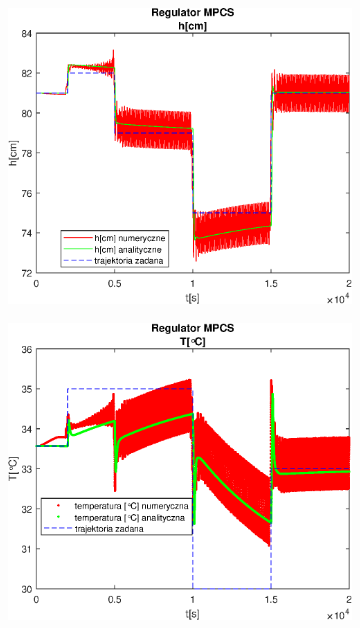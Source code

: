 \begin{figure}[h!]
   \centering
   \begin{subfigure}[b]{0.4\textwidth}
      \includegraphics[width=1\linewidth]{img/MPCSnumRK/MPCSRKHN150Nu25l60.eps}
      \caption{}
      \label{fig:fig:MPCSRKN150Nu25l601}
   \end{subfigure}
       
   \begin{subfigure}[b]{0.4\textwidth}
      \includegraphics[width=1\linewidth]{img/MPCSnumRK/MPCSRKTN150Nu25l60.eps}
      \caption{}
      \label{fig:fig:MPCSRKN150Nu25l602}
   \end{subfigure}
       

\end{figure}

